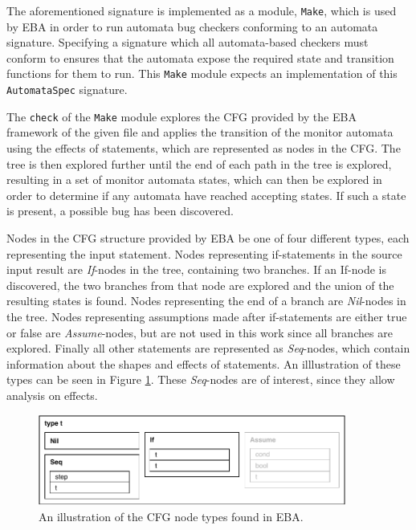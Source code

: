 \newpar The aforementioned signature is implemented as a module, \texttt{Make}, which is used by EBA in order to run automata bug checkers conforming to an automata signature. Specifying a signature which all automata-based checkers must conform to ensures that the automata expose the required state and transition functions for them to run. This \texttt{Make} module expects an implementation of this \texttt{AutomataSpec} signature. 

\newpar The \texttt{check} of the \texttt{Make} module explores the CFG provided by the EBA framework of the given file and applies the transition of the monitor automata using the effects of statements, which are represented as nodes in the CFG. The tree is then explored further until the end of each path in the tree is explored, resulting in a set of monitor automata states, which can then be explored in order to determine if any automata have reached accepting states. If such a state is present, a possible bug has been discovered. 

\newpar Nodes in the CFG structure provided by EBA be one of four different types, each representing the input statement. Nodes representing if-statements in the source input result are \textit{If}-nodes in the tree, containing two branches. If an If-node is discovered, the two branches from that node are explored and the union of the resulting states is found. Nodes representing the end of a branch are \textit{Nil}-nodes in the tree. Nodes representing assumptions made after if-statements are either true or false are \textit{Assume}-nodes, but are not used in this work since all branches are explored. Finally all other statements are represented as \textit{Seq}-nodes, which contain information about the shapes and effects of statements. An illlustration of these types can be seen in Figure \ref{cfg-nodes}. These \textit{Seq}-nodes are of interest, since they allow analysis on effects.  

\begin{figure}[H]
    \centering
    \includegraphics[width=0.9\textwidth]{implementation/figures/node}
    \caption{An illustration of the CFG node types found in EBA.}
    \label{cfg-nodes}
\end{figure}

